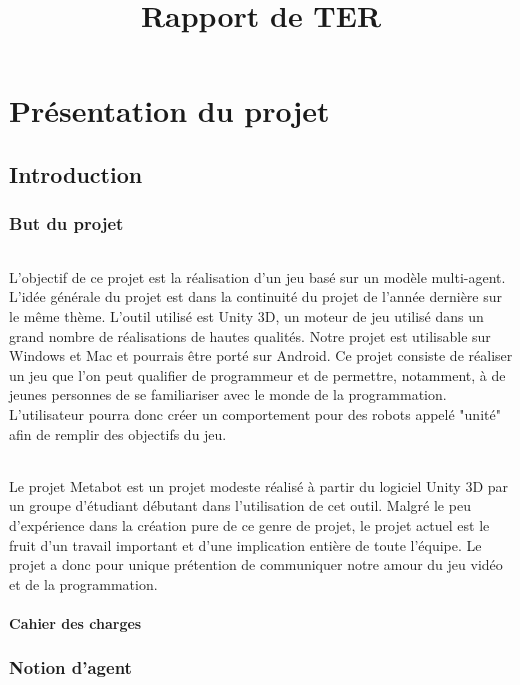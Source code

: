 \documentclass{report}
\title{Rapport de TER}
\begin{document}
\maketitle
\newpage
\tableofcontents
\newpage

\part{Présentation du projet}
\chapter{Introduction}
\section{But du projet}
\paragraph{}
L'objectif de ce projet est la réalisation d'un jeu basé sur un modèle multi-agent. L'idée générale du projet est dans la continuité du projet de l'année dernière sur le même thème. L'outil utilisé est Unity 3D, un moteur de jeu utilisé dans un grand nombre de réalisations de hautes qualités. Notre projet est utilisable sur Windows et Mac et pourrais être porté sur Android.
Ce projet consiste de réaliser un jeu que l'on peut qualifier de programmeur et de permettre, notamment, à de jeunes personnes de se familiariser avec le monde de la programmation. L'utilisateur pourra donc créer un comportement pour des robots appelé "unité" afin de remplir des objectifs du jeu.
\paragraph{}
Le projet Metabot est un projet modeste réalisé à partir du logiciel Unity 3D par un groupe d'étudiant débutant dans l'utilisation de cet outil. Malgré le peu d'expérience dans la création pure de ce genre de projet, le projet actuel est le fruit d'un travail important et d'une implication entière de toute l'équipe.
Le projet a donc pour unique prétention de communiquer notre amour du jeu vidéo et de la programmation.
\subsection{Cahier des charges}
\section{Notion d'agent}
\end{document}
